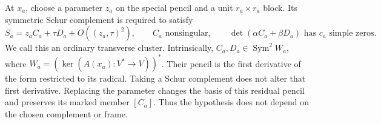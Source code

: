 \documentclass[11pt,reqno]{amsart}
\numberwithin{equation}{section}
\theoremstyle{definition}\newtheorem{definition}[theorem]{Definition}
\theoremstyle{remark}\newtheorem{remark}[theorem]{Remark}
\DeclareMathOperator{\Sym}{Sym}\DeclareMathOperator{\Gr}{Gr}
\begin{document}
At $x_a$, choose a parameter $z_a$ on the special pencil and a unit
$r_a\times r_a$ block. Its symmetric Schur complement is required to
satisfy
\begin{equation}\label{eq:ordinary-cluster-v159}
 S_a=z_a C_a+\tau D_a+O((z_a,\tau)^2),\qquad
 C_a\text{ nonsingular},\qquad
 \det(\alpha C_a+\beta D_a)\text{ has }c_a\text{ simple zeros}.
\end{equation}
We call this an ordinary transverse cluster. Intrinsically,
$C_a,D_a\in\Sym^2W_a$, where
$W_a=(\ker(A(x_a):V^*\to V))^*$. Their pencil is the first derivative
of the form restricted to its radical. Taking a Schur complement does
not alter that first derivative. Replacing the parameter changes the
basis of this residual pencil and preserves its marked member $[C_a]$.
Thus the hypothesis does not depend on the chosen complement or frame.
\end{document}
